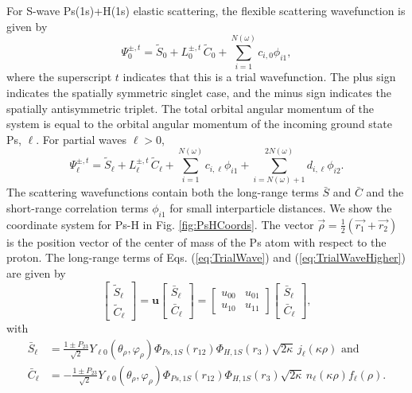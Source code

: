 \documentclass[preprint,showpacs,preprintnumbers,amsmath,amssymb,longbibliography,pra,aps]{revtex4-1}
\begin{document}
For S-wave Ps(1s)+H(1s) elastic scattering, the flexible scattering wavefunction is given by
\begin{equation}
\Psi_0^{\pm,t} = \widetilde{S}_0 + L_0^{\pm,t} \, \widetilde{C}_0 + \sum_{i=1}^{N(\omega)} c_{i,0} \phi_{i1},
\label{eq:TrialWave}
\end{equation}
where the superscript $t$ indicates that this is a trial wavefunction. The plus sign indicates the spatially symmetric singlet case, and the minus sign indicates the spatially antisymmetric triplet. The total orbital angular momentum of the system is equal to the orbital angular momentum of the incoming ground state Ps, $\ell$. For partial waves $\ell > 0$,
\begin{equation}
\Psi_\ell^{\pm,t} = \widetilde{S}_\ell + L^{\pm,t}_\ell \, \widetilde{C}_\ell + \sum_{i=1}^{N(\omega)} c_{i,\ell} \phi_{i1} + \!\!\!\sum_{i=N(\omega)+1}^{2N(\omega)} \!\! d_{i,\ell} \phi_{i2}.
\label{eq:TrialWaveHigher}
\end{equation}
The scattering wavefunctions contain both the long-range terms $\bar{S}$ and $\bar{C}$ and the short-range correlation terms $\phi_{i1}$ for small interparticle distances. We show the coordinate system for Ps-H in Fig. \ref{fig:PsHCoords}. The vector $\vec{\rho} = \frac{1}{2}\left(\vec{r_1} + \vec{r_2}\right)$ is the position vector of the center of mass of the Ps atom with respect to the proton. The long-range terms of Eqs. (\ref{eq:TrialWave}) and (\ref{eq:TrialWaveHigher}) are given by
\begin{equation}
\label{eq:SCPhiDef}
\begin{bmatrix}
\widetilde{S}_\ell \\ \widetilde{C}_\ell
\end{bmatrix} = \textbf{u}  \begin{bmatrix}
\bar{S}_\ell \\ \bar{C}_\ell
\end{bmatrix} = \begin{bmatrix}
u_{00} & u_{01} \\  u_{10} & u_{11}
\end{bmatrix}
\begin{bmatrix}
\bar{S}_\ell \\ \bar{C}_\ell
\end{bmatrix}, 
\end{equation}
with
\begin{subequations}
\label{eq:SCBarPhiDef}
\begin{align}
\bar{S}_\ell &= \frac{1\pm P_{23}}{\sqrt{2}}Y_{\ell 0}(\theta_\rho,\varphi_\rho)\Phi_{Ps,1S}\left(r_{12}\right) \Phi_{H,1S}\left(r_3\right) \sqrt{2\kappa} \,j_\ell\left(\kappa\rho\right) \text{ and} \label{eq:SBar} \\
\bar{C}_\ell &= -\frac{1\pm P_{23}}{\sqrt{2}}Y_{\ell 0}(\theta_\rho,\varphi_\rho)\Phi_{Ps,1S}\left(r_{12}\right) \Phi_{H,1S}\left(r_3\right) \sqrt{2\kappa} \,n_\ell\left(\kappa\rho\right) f_\ell(\rho). \label{eq:CBar}
\end{align}
\end{subequations}
\end{document}
